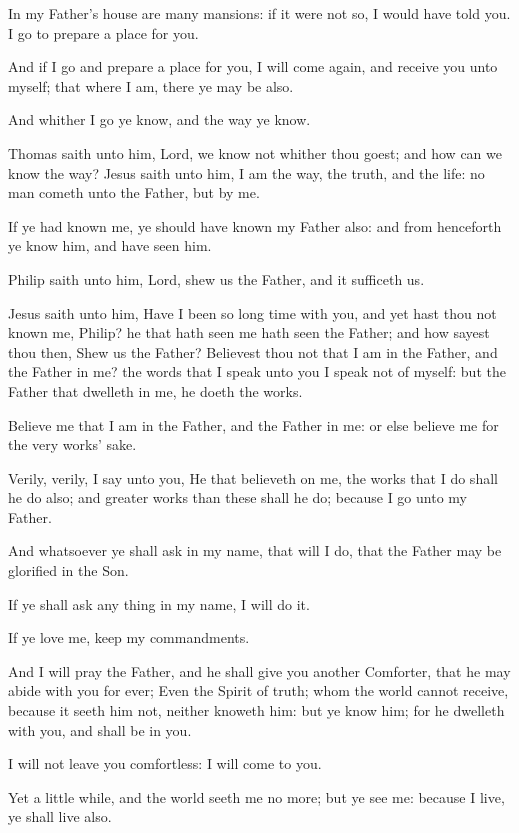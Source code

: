 \Verse In my Father's house are many mansions: if it were not so, I would have told you. I go to prepare a place for you.

\Verse And if I go and prepare a place for you, I will come again, and receive you unto myself; that where I am, there ye may be also.

\Verse And whither I go ye know, and the way ye know.

\Verse Thomas saith unto him, Lord, we know not whither thou goest; and how can we know the way?  \Verse Jesus saith unto him, I am the way, the truth, and the life: no man cometh unto the Father, but by me.

\Verse If ye had known me, ye should have known my Father also: and from henceforth ye know him, and have seen him.

\Verse Philip saith unto him, Lord, shew us the Father, and it sufficeth us.

\Verse Jesus saith unto him, Have I been so long time with you, and yet hast thou not known me, Philip? he that hath seen me hath seen the Father; and how sayest thou then, Shew us the Father?  \Verse Believest thou not that I am in the Father, and the Father in me?  the words that I speak unto you I speak not of myself: but the Father that dwelleth in me, he doeth the works.

\Verse Believe me that I am in the Father, and the Father in me: or else believe me for the very works' sake.

\Verse Verily, verily, I say unto you, He that believeth on me, the works that I do shall he do also; and greater works than these shall he do; because I go unto my Father.

\Verse And whatsoever ye shall ask in my name, that will I do, that the Father may be glorified in the Son.

\Verse If ye shall ask any thing in my name, I will do it.

\Verse If ye love me, keep my commandments.

\Verse And I will pray the Father, and he shall give you another Comforter, that he may abide with you for ever; \Verse Even the Spirit of truth; whom the world cannot receive, because it seeth him not, neither knoweth him: but ye know him; for he dwelleth with you, and shall be in you.

\Verse I will not leave you comfortless: I will come to you.

\Verse Yet a little while, and the world seeth me no more; but ye see me: because I live, ye shall live also.

